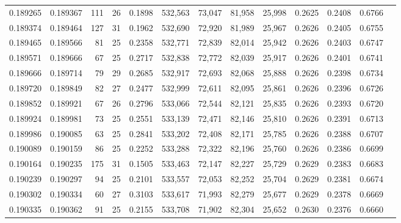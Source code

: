 \begin{tabular}{rrrrrrrrrrrrr}
0.189265 & 0.189367 &   111 &  26 &                                     0.1898 & 532,563 &  73,047 &  81,958 &  25,998 & 0.2625 & 0.2408 & 0.6766 \\
0.189374 & 0.189464 &   127 &  31 &                                     0.1962 & 532,690 &  72,920 &  81,989 &  25,967 & 0.2626 & 0.2405 & 0.6755 \\
0.189465 & 0.189566 &    81 &  25 &                                     0.2358 & 532,771 &  72,839 &  82,014 &  25,942 & 0.2626 & 0.2403 & 0.6747 \\
0.189571 & 0.189666 &    67 &  25 &                                     0.2717 & 532,838 &  72,772 &  82,039 &  25,917 & 0.2626 & 0.2401 & 0.6741 \\
0.189666 & 0.189714 &    79 &  29 &                                     0.2685 & 532,917 &  72,693 &  82,068 &  25,888 & 0.2626 & 0.2398 & 0.6734 \\
0.189720 & 0.189849 &    82 &  27 &                                     0.2477 & 532,999 &  72,611 &  82,095 &  25,861 & 0.2626 & 0.2396 & 0.6726 \\
0.189852 & 0.189921 &    67 &  26 &                                     0.2796 & 533,066 &  72,544 &  82,121 &  25,835 & 0.2626 & 0.2393 & 0.6720 \\
0.189924 & 0.189981 &    73 &  25 &                                     0.2551 & 533,139 &  72,471 &  82,146 &  25,810 & 0.2626 & 0.2391 & 0.6713 \\
0.189986 & 0.190085 &    63 &  25 &                                     0.2841 & 533,202 &  72,408 &  82,171 &  25,785 & 0.2626 & 0.2388 & 0.6707 \\
0.190089 & 0.190159 &    86 &  25 &                                     0.2252 & 533,288 &  72,322 &  82,196 &  25,760 & 0.2626 & 0.2386 & 0.6699 \\
0.190164 & 0.190235 &   175 &  31 &                                     0.1505 & 533,463 &  72,147 &  82,227 &  25,729 & 0.2629 & 0.2383 & 0.6683 \\
0.190239 & 0.190297 &    94 &  25 &                                     0.2101 & 533,557 &  72,053 &  82,252 &  25,704 & 0.2629 & 0.2381 & 0.6674 \\
0.190302 & 0.190334 &    60 &  27 &                                     0.3103 & 533,617 &  71,993 &  82,279 &  25,677 & 0.2629 & 0.2378 & 0.6669 \\
0.190335 & 0.190362 &    91 &  25 &                                     0.2155 & 533,708 &  71,902 &  82,304 &  25,652 & 0.2630 & 0.2376 & 0.6660 \\

\end{tabular}

